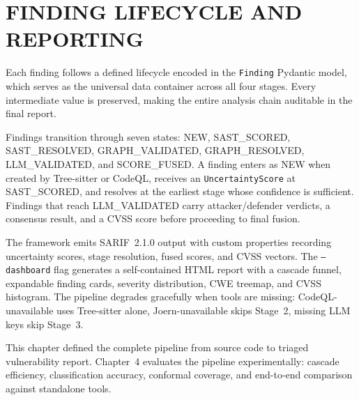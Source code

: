 \section{\uppercase{Finding Lifecycle and Reporting}}
\label{sec:reporting}

Each finding follows a defined lifecycle encoded in the \texttt{Finding} Pydantic model, which serves as the universal data container across all four stages. Every intermediate value is preserved, making the entire analysis chain auditable in the final report.

Findings transition through seven states: NEW, SAST\_SCORED, SAST\_RESOLVED, GRAPH\_VALIDATED, GRAPH\_RESOLVED, LLM\_VALIDATED, and SCORE\_FUSED. A finding enters as NEW when created by Tree-sitter or CodeQL, receives an \texttt{UncertaintyScore} at SAST\_SCORED, and resolves at the earliest stage whose confidence is sufficient. Findings that reach LLM\_VALIDATED carry attacker/defender verdicts, a consensus result, and a CVSS score before proceeding to final fusion.

The framework emits SARIF~2.1.0 output with custom properties recording uncertainty scores, stage resolution, fused scores, and CVSS vectors. The \texttt{--dashboard} flag generates a self-contained HTML report with a cascade funnel, expandable finding cards, severity distribution, CWE treemap, and CVSS histogram. The pipeline degrades gracefully when tools are missing: CodeQL-unavailable uses Tree-sitter alone, Joern-unavailable skips Stage~2, missing LLM keys skip Stage~3.

\vspace{0.5em}

This chapter defined the complete pipeline from source code to triaged vulnerability report. Chapter~4 evaluates the pipeline experimentally: cascade efficiency, classification accuracy, conformal coverage, and end-to-end comparison against standalone tools.
